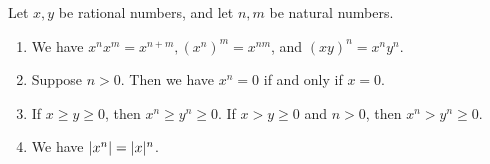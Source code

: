 \begin{proposition}  \label{prop 4.3.10}
Let \(x, y\) be rational numbers, and let \(n, m\) be natural numbers.
\begin{enumerate}
    \item
        We have \(x^nx^m = x^{n+m}, (x^n)^m = x^{nm}\), and \((xy)^n = x^ny^n\).
    \item
        Suppose \(n > 0\). Then we have \(x^n = 0\) if and only if \(x = 0\).
    \item
        If \(x \ge y \ge 0\), then \(x^n \ge y^n \ge 0\). If \(x > y \ge 0\) and \(n > 0\), then \(x^n > y^n \ge 0\).
    \item We have \(\lvert x^n\rvert = \lvert x\rvert^n\).
\end{enumerate}
\end{proposition}

